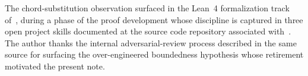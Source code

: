 \documentclass[11pt,a4paper]{amsart}
\begin{document}
The chord-substitution observation surfaced in the Lean~4 formalization
track of~\cite{El2}, during a phase of the proof development whose
discipline is captured in three open project skills documented at the
source code repository associated with~\cite{El2}. The author thanks the
internal adversarial-review process described in the same source for
surfacing the over-engineered boundedness hypothesis whose retirement
motivated the present note.



\end{document}
